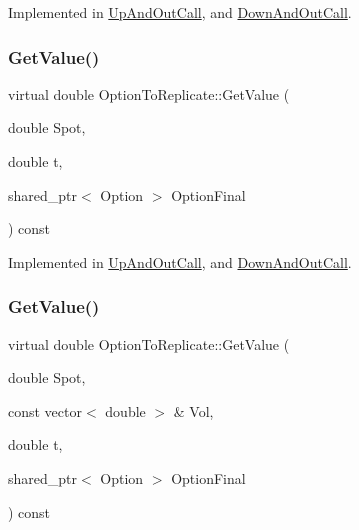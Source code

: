 Implemented in \hyperlink{classUpAndOutCall_a2e25a8a717d611d6593fb9387e9d3b22}{Up\+And\+Out\+Call}, and \hyperlink{classDownAndOutCall_a0b8b44b58822b7c4f75e2436b9cf69d7}{Down\+And\+Out\+Call}.

\hypertarget{classOptionToReplicate_a7f39f64594b4baffb45d61a65b38c6b2}{}\label{classOptionToReplicate_a7f39f64594b4baffb45d61a65b38c6b2} 
\subsubsection{\texorpdfstring{Get\+Value()}{GetValue()}\hspace{0.1cm}{\footnotesize\ttfamily [1/2]}}
{\footnotesize\ttfamily virtual double Option\+To\+Replicate\+::\+Get\+Value (\begin{DoxyParamCaption}\item[{double}]{Spot,  }\item[{double}]{t,  }\item[{shared\+\_\+ptr$<$ Option $>$}]{Option\+Final }\end{DoxyParamCaption}) const\hspace{0.3cm}{\ttfamily [pure virtual]}}



Implemented in \hyperlink{classUpAndOutCall_a472ab725d98145e17219dbc6106b7b5c}{Up\+And\+Out\+Call}, and \hyperlink{classDownAndOutCall_ab5855704cc4680238596427a115cb3e1}{Down\+And\+Out\+Call}.

\hypertarget{classOptionToReplicate_a738f813473de4945df377bcd3fe17f6e}{}\label{classOptionToReplicate_a738f813473de4945df377bcd3fe17f6e} 
\subsubsection{\texorpdfstring{Get\+Value()}{GetValue()}\hspace{0.1cm}{\footnotesize\ttfamily [2/2]}}
{\footnotesize\ttfamily virtual double Option\+To\+Replicate\+::\+Get\+Value (\begin{DoxyParamCaption}\item[{double}]{Spot,  }\item[{const vector$<$ double $>$ \&}]{Vol,  }\item[{double}]{t,  }\item[{shared\+\_\+ptr$<$ Option $>$}]{Option\+Final }\end{DoxyParamCaption}) const\hspace{0.3cm}{\ttfamily [pure virtual]}}



